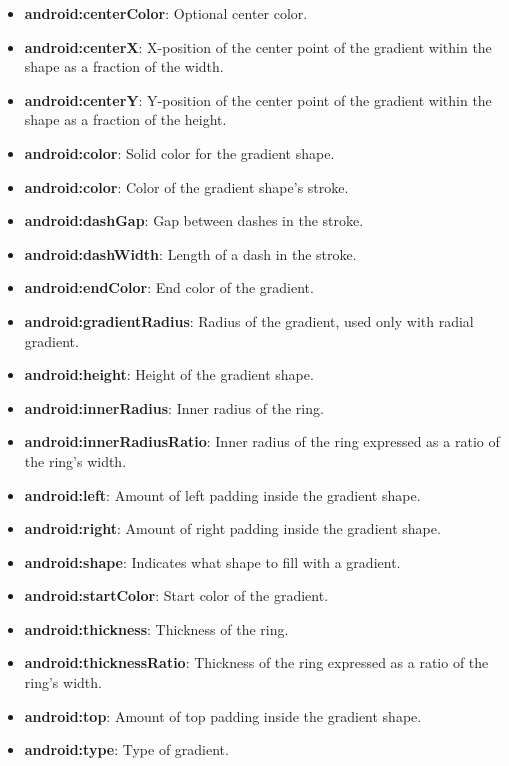 \documentclass{report}
\begin{document}
\begin{itemize}
\begin{itemize}
                \item \textbf{android:centerColor}:	Optional center color. 
                \item \textbf{android:centerX}:	X-position of the center point of the gradient within the shape as a fraction of the width. 
                \item \textbf{android:centerY}:	Y-position of the center point of the gradient within the shape as a fraction of the height. 
                \item \textbf{android:color}:	Solid color for the gradient shape. 
                \item \textbf{android:color}:	Color of the gradient shape's stroke. 
                \item \textbf{android:dashGap}:	Gap between dashes in the stroke. 
                \item \textbf{android:dashWidth}:	Length of a dash in the stroke. 
                \item \textbf{android:endColor}:	End color of the gradient. 
                \item \textbf{android:gradientRadius}:	Radius of the gradient, used only with radial gradient. 
                \item \textbf{android:height}:	Height of the gradient shape. 
                \item \textbf{android:innerRadius}:	Inner radius of the ring. 
                \item \textbf{android:innerRadiusRatio}:	Inner radius of the ring expressed as a ratio of the ring's width. 
                \item \textbf{android:left}:	Amount of left padding inside the gradient shape. 
                \item \textbf{android:right}:	Amount of right padding inside the gradient shape. 
                \item \textbf{android:shape}:	Indicates what shape to fill with a gradient. 
                \item \textbf{android:startColor}:	Start color of the gradient. 
                \item \textbf{android:thickness}:	Thickness of the ring. 
                \item \textbf{android:thicknessRatio}:	Thickness of the ring expressed as a ratio of the ring's width. 
                \item \textbf{android:top}:	Amount of top padding inside the gradient shape. 
                \item \textbf{android:type}:	Type of gradient. 

\end{itemize}
\end{itemize}
\end{document}
